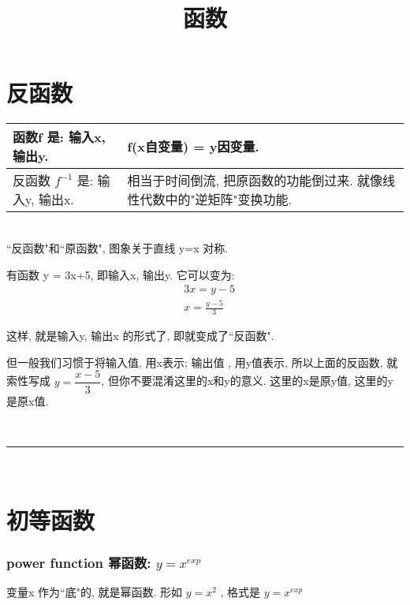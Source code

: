\documentclass[UTF8]{ctexart}
\title{函数}
\begin{document}
	\tableofcontents %
	\maketitle  %

\part{反函数}



\begin{tabular}{|l| l| }
	\hline
	函数f 是: 输入x, 输出y.
	 &  f(x自变量) = y因变量. \\	 
	\hline	
	
	反函数 $f^{-1}$ 是: 输入y, 输出x. 
	&  相当于时间倒流, 把原函数的功能倒过来. 就像线性代数中的"逆矩阵"变换功能.\\
	\hline
\end{tabular}
\\

``反函数"和``原函数", 图象关于直线 y=x 对称. \\


\begin{myEnvSample}
有函数 y = 3x+5, 即输入x, 输出y. 它可以变为: 
	\begin{align*}
		& 3x = y-5 \\
		& x = \frac{y-5} {3} 
	\end{align*}
	
	这样, 就是输入y, 输出x 的形式了, 即就变成了``反函数".
	
	但一般我们习惯于将输入值, 用x表示; 输出值 , 用y值表示, 所以上面的反函数, 就索性写成  $ y = \dfrac{x-5} {3} $, 但你不要混淆这里的x和y的意义. 这里的x是原y值, 这里的y是原x值.
\end{myEnvSample}



~\\
\hrule
~\\


\part{初等函数}

\section{power function 幂函数:  $ y = x^{exp} $}

变量x 作为``底"的, 就是幂函数. 形如 $ y=x^2 $ , 格式是 $ y = x^{exp} $
\end{document}
